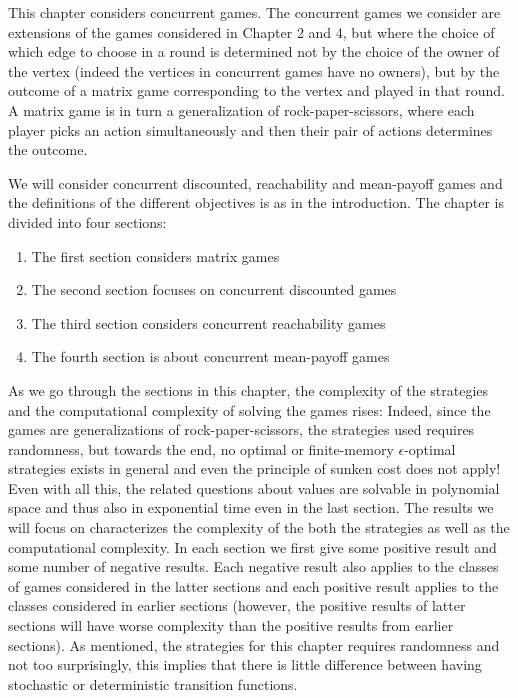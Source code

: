 \newcommand{\ValueOp}{\text{valOp}}
\newcommand{\rk}{\text{rk}}
\newcommand{\crgLim}{\text{crgLim1}}



This chapter considers concurrent games. The concurrent games we consider are extensions of the games considered in Chapter 2 and 4, but 
where the choice of which edge to choose in a round is determined not by the choice of the owner of the vertex (indeed the vertices in concurrent games have no owners), but by the outcome of a matrix game corresponding to the vertex and played in that round. 
A matrix game is in turn a generalization of rock-paper-scissors, where each player picks an action simultaneously and then their pair of actions determines the outcome.

We will consider concurrent discounted, reachability and mean-payoff games and the definitions of the different objectives is as in the introduction. 
The chapter is divided into four sections:
\begin{enumerate}
\item The first section considers matrix games
\item The second section focuses on concurrent discounted games
\item The third section considers concurrent reachability games
\item The fourth section is about concurrent mean-payoff games
\end{enumerate}
As we go through the sections in this chapter, the complexity of the strategies and the computational complexity of solving the games rises: Indeed, since the games are generalizations of rock-paper-scissors, the strategies used requires randomness, but towards the end, no optimal or finite-memory $\epsilon$-optimal strategies exists in general and even the principle of sunken cost does not apply! 
Even with all this, the related questions about values are solvable in polynomial space and thus also in exponential time even in the last section.
The results we will focus on characterizes the complexity of the both the strategies as well as the computational complexity.
In each section we first give some positive result and some number of negative results. Each negative result also applies to the classes of games considered in the latter sections and each positive result applies to the classes considered in earlier sections (however, the positive results of latter sections will have worse complexity than the positive results from earlier sections).
As mentioned, the strategies for this chapter requires randomness and not too surprisingly, this implies that there is little difference between having stochastic or deterministic transition functions.

